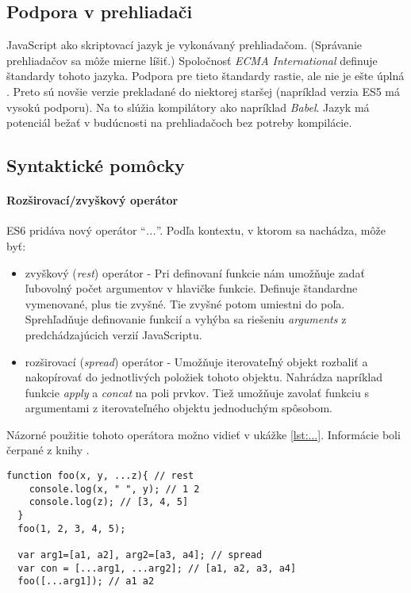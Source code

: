 \subsection{Podpora v prehliadači}
\NEW{}
JavaScript ako skriptovací jazyk je vykonávaný prehliadačom. (Správanie prehliadačov sa môže mierne líšiť.) Spoločnosť \emph{ECMA International} definuje štandardy tohoto jazyka. Podpora pre tieto štandardy rastie, ale nie je ešte úplná \cite{podporaES7}. 
Preto sú novšie verzie prekladané do niektorej staršej (napríklad verzia ES5 má vysokú podporu). Na to slúžia kompilátory ako napríklad \emph{Babel}. Jazyk \JS{} má potenciál bežať v budúcnosti na prehliadačoch bez potreby kompilácie.

\subsection{Syntaktické pomôcky}

\paragraph{Rozširovací/zvyškový operátor}
\label{par:spreadOp}
ES6 pridáva nový operátor ``\emph{...}''. Podľa kontextu, v ktorom sa nachádza, môže byť:
\begin{itemize}
  \item zvyškový (\emph{rest}) operátor - Pri definovaní funkcie nám umožňuje zadať ľubovolný počet argumentov v hlavičke funkcie. Definuje štandardne vymenované, plus tie zvyšné. Tie zvyšné potom umiestni do poľa. Sprehľadňuje definovanie funkcií a vyhýba sa riešeniu \emph{arguments} z predchádzajúcich verzií JavaScriptu.
  \item rozširovací (\emph{spread}) operátor - Umožňuje iterovateľný objekt rozbaliť a nakopírovať do jednotlivých položiek tohoto objektu. Nahrádza napríklad funkcie \emph{apply} a \emph{concat} na poli prvkov. Tiež umožňuje zavolať funkciu s argumentami z iterovateľného objektu jednoduchým spôsobom.
\end{itemize}
Názorné použitie tohoto operátora možno vidieť v ukážke \ref{lst:...}.
Informácie boli čerpané z knihy \cite[Exploring ES6]{expES6}.

\begin{lstlisting}[caption=rozširovací/zvyškový operátor, label={lst:...}]
  function foo(x, y, ...z){ // rest
    console.log(x, " ", y); // 1 2
    console.log(z); // [3, 4, 5]
  }
  foo(1, 2, 3, 4, 5);

  var arg1=[a1, a2], arg2=[a3, a4]; // spread
  var con = [...arg1, ...arg2]; // [a1, a2, a3, a4]
  foo([...arg1]); // a1 a2
\end{lstlisting}

